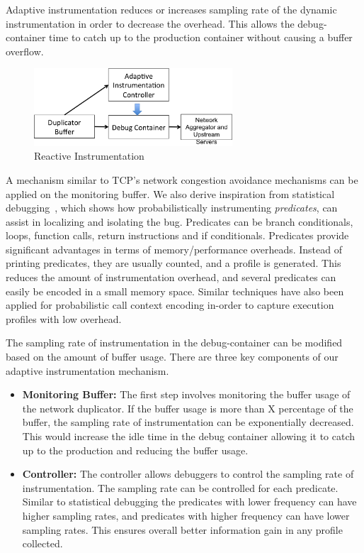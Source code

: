Adaptive instrumentation reduces or increases sampling rate of the dynamic instrumentation in order to decrease the overhead. 
This allows the debug-container time to catch up to the production container without causing a buffer overflow.

\begin{figure}[ht!]
	\begin{center}
		\includegraphics[width=0.66\textwidth]{queue/figs/reactive-controller.png}
		\caption{Reactive Instrumentation}
		\label{fig:reactive}
	\end{center}
\end{figure}

A mechanism similar to TCP's network congestion avoidance mechanisms can be applied on the monitoring buffer.
We also derive inspiration from statistical debugging~\cite{statistical-performance,holmes,statistical}, which shows how probabilistically instrumenting \emph{predicates}, can assist in localizing and isolating the bug. 
Predicates can be branch conditionals, loops, function calls, return instructions and if conditionals.
Predicates provide significant advantages in terms of memory/performance overheads.
Instead of printing predicates, they are usually counted, and a profile is generated.
This reduces the amount of instrumentation overhead, and several predicates can easily be encoded in a small memory space.
Similar techniques have also been applied for probabilistic call context encoding in-order to capture execution profiles with low overhead.


The sampling rate of instrumentation in the debug-container can be modified based on the amount of buffer usage.
There are three key components of our adaptive instrumentation mechanism.

\begin{itemize}
	\item \textbf{Monitoring Buffer:}
	The first step involves monitoring the buffer usage of the network duplicator. 
	If the buffer usage is more than X percentage of the buffer, the sampling rate of instrumentation can be exponentially decreased.
	This would increase the idle time in the debug container allowing it to catch up to the production and reducing the buffer usage.
	
	\item \textbf{Controller:}
	The controller allows debuggers to control the sampling rate of instrumentation.
	The sampling rate can be controlled for each predicate.
	Similar to statistical debugging the predicates with lower frequency can have higher sampling rates, and predicates with higher frequency can have lower sampling rates. This ensures overall better information gain in any profile collected.  	
	
\end{itemize}

